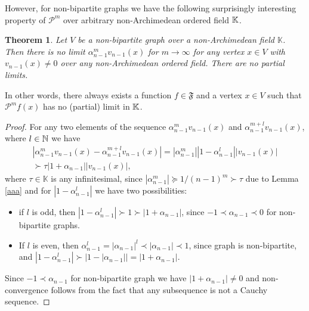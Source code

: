 \documentclass[a4paper,12pt]{amsart}
\newtheorem{theorem}{Theorem}
\theoremstyle{definition}
\renewcommand{\P}{\mathcal{P}}
\newcommand{\K}{\mathbb{K}}
\begin{document}
However, for non-bipartite graphs we have the following surprisingly interesting property of $\P^m$ over arbitrary non-Archimedean ordered field $\Bbb K$.
\begin{theorem}\label{Prop3}
Let $V$ be a non-bipartite graph over a non-Archimedean field $\K$. Then there is no limit $\mathcal \alpha_{n-1}^m v_{n-1}(x)$ for $m\to \infty$ for any vertex $x\in V$ with $v_{n-1}(x)\ne 0$ over any non-Archimedean ordered field.
There are no partial limits.
\end{theorem}
In other words, there always exists a function $f\in \mathfrak F$ and a vertex $x\in V$ such that $\P^{m}f(x)$ has no (partial) limit in $\Bbb K$.
\begin{proof}
For any two elements of the sequence $\alpha_{n-1}^{m} v_{n-1}(x)$ and $\alpha_{n-1}^{m+l} v_{n-1}(x)$, where $l\in \Bbb N$
we have
\begin{multline*}
|\alpha_{n-1}^{m} v_{n-1}(x)-\alpha_{n-1}^{m+l} v_{n-1}(x)|=|\alpha_{n-1}^{m}||1-\alpha_{n-1}^l|| v_{n-1}(x)|\\
\succ {\tau}|1+\alpha_{n-1}|{|v_{n-1}(x)|},
\end{multline*}
where $\tau\in\K$ is any infinitesimal, since $|\alpha_{n-1}^{m}|\succeq 1/(n-1)^m\succ \tau$ due to Lemma \ref{aaa} and for $|1-\alpha_{n-1}^l|$ we have two possibilities:
\begin{itemize}
\item
if $l$  is odd, then $|1-\alpha_{n-1}^l|\succ 1\succ |1+\alpha_{n-1}|$, since $-1\prec \alpha_{n-1}\prec 0$ for non-bipartite graphs.
\item
If $l$  is even, then $\alpha_{n-1}^l=|\alpha_{n-1}|^l\prec |\alpha_{n-1}|\prec 1$, since graph is non-bipartite, and
$|1-\alpha_{n-1}^l|\succ |1-|\alpha_{n-1}||=|1+\alpha_{n-1}|$.
\end{itemize}
Since $-1\prec \alpha_{n-1}$ for non-bipartite graph we have $|1+\alpha_{n-1}|\ne 0$ and
non-convergence follows from the fact that any subsequence is not a Cauchy sequence.

\end{proof}
\end{document}
